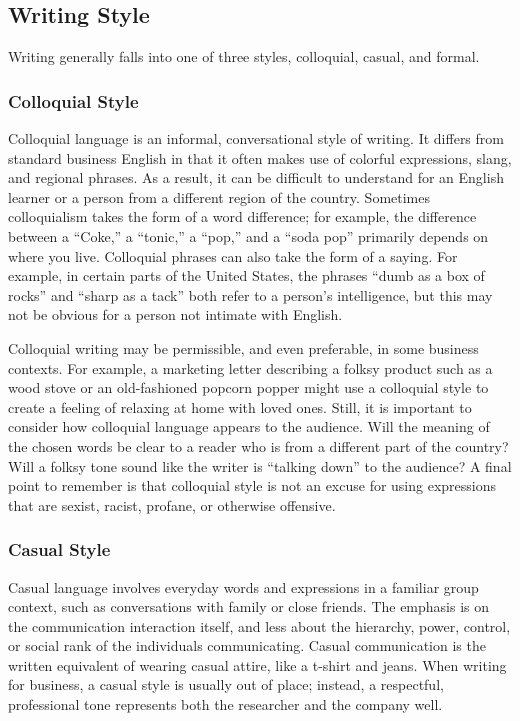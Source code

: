 \subsection{Writing Style}

Writing generally falls into one of three styles, colloquial, casual, and formal.

\subsubsection{Colloquial Style}

Colloquial language is an informal, conversational style of writing. It differs from standard business English in that it often makes use of colorful expressions, slang, and regional phrases. As a result, it can be difficult to understand for an English learner or a person from a different region of the country. Sometimes colloquialism takes the form of a word difference; for example, the difference between a ``Coke,'' a ``tonic,'' a ``pop,'' and a ``soda pop'' primarily depends on where you live. Colloquial phrases can also take the form of a saying. For example, in certain parts of the United States, the phrases ``dumb as a box of rocks'' and ``sharp as a tack'' both refer to a person's intelligence, but this may not be obvious for a person not intimate with English.

Colloquial writing may be permissible, and even preferable, in some business contexts. For example, a marketing letter describing a folksy product such as a wood stove or an old-fashioned popcorn popper might use a colloquial style to create a feeling of relaxing at home with loved ones. Still, it is important to consider how colloquial language  appears to the audience. Will the meaning of the chosen words be clear to a reader who is from a different part of the country? Will a folksy tone sound like the writer is ``talking down'' to the audience? A final point to remember is that colloquial style is not an excuse for using expressions that are sexist, racist, profane, or otherwise offensive.

\subsubsection{Casual Style}

Casual language involves everyday words and expressions in a familiar group context, such as conversations with family or close friends. The emphasis is on the communication interaction itself, and less about the hierarchy, power, control, or social rank of the individuals communicating. Casual communication is the written equivalent of wearing casual attire, like a t-shirt and jeans. When writing for business, a casual style is usually out of place; instead, a respectful, professional tone represents both the researcher and the company well.


